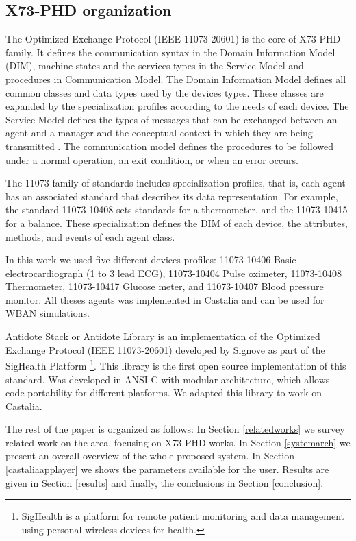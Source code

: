 \subsection{X73-PHD organization}

The Optimized Exchange
Protocol (IEEE 11073-20601) is the core of X73-PHD family. It defines the communication syntax in the Domain Information Model (DIM), machine states and the services types in the Service Model and procedures in Communication Model. 
The Domain Information Model defines all common classes and data types used by the devices types. These classes are expanded by the specialization profiles according to the needs of each device. The Service Model defines the types of messages that can be exchanged between an agent and a manager and the conceptual context in which they are being transmitted \cite{b17}. The communication model defines the procedures to be followed under a normal operation, an exit condition, or when an error occurs.

The 11073 family of standards includes specialization profiles, that is, each agent has an associated standard that describes its data representation. For example, the standard 11073-10408 sets standards for a thermometer,
and the 11073-10415 for a balance. These specialization defines the DIM of each device, the attributes, methods, and events of each agent class.

In this work we used five different devices profiles: 11073-10406 Basic electrocardiograph (1 to 3 lead ECG), 11073-10404 Pulse oximeter, 11073-10408 Thermometer, 
11073-10417 Glucose meter, and 11073-10407 Blood pressure monitor. All theses agents was implemented in Castalia and can be used for WBAN simulations.

Antidote Stack or Antidote Library is an implementation of the Optimized Exchange Protocol (IEEE 11073-20601) developed by Signove as part of the SigHealth Platform \footnote{SigHealth is a platform for remote patient monitoring and data management using personal wireless devices for health.}. This library is the first open source implementation of this standard. Was developed in ANSI-C with modular architecture, which allows code portability for different platforms. We adapted this library to work on Castalia.

The rest of the paper is organized as follows: In Section \ref{relatedworks} we survey related work on the area, focusing on X73-PHD works. In Section \ref{systemarch} we present an overall overview of the whole proposed system. In Section \ref{castaliaapplayer} we shows the parameters available for the user. Results are given in Section \ref{results} and finally, the conclusions in Section \ref{conclusion}.